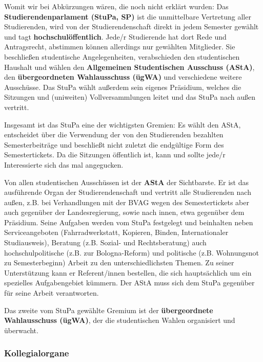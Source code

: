 Womit wir bei Abkürzungen wären, die noch nicht erklärt wurden: Das \textbf{Studierendenparlament (StuPa, SP)} ist die 
unmittelbare Vertretung aller Studierenden, wird von der Studierendenschaft 
direkt in jedem Semester gewählt und tagt \textbf{hochschulöffentlich}.
Jede/r Studierende hat dort Rede und Antragsrecht, abstimmen können allerdings nur 
gewählten Mitglieder. Sie beschließen studentische Angelegenheiten, verabschieden den studentischen
Haushalt und wählen den \textbf{Allgemeinen Studentischen Ausschuss (AStA)},
den \textbf{übergeordneten Wahlausschuss (ügWA)}
und verschiedene weitere Ausschüsse. Das StuPa wählt außerdem sein eigenes
Präsidium, welches die Sitzungen und (uniweiten) Vollversammlungen leitet und
das StuPa nach außen  vertritt.  

Insgesamt ist das StuPa eine der wichtigsten Gremien: Es wählt den AStA, entscheidet über die Verwendung der von den Studierenden bezahlten Semesterbeiträge 
und beschließt nicht zuletzt die endgültige Form des Semestertickets. 
Da die Sitzungen öffentlich ist, kann und sollte jede/r Interessierte sich das mal angegucken.

Von allen studentischen Ausschüssen ist der \textbf{AStA}  der
Sichtbarste. Er ist das ausführende Organ der 
Studierendenschaft und vertritt alle Studierenden nach außen, z.B. bei
Verhandlungen mit der BVAG wegen des Semestertickets aber auch gegenüber der 
Landesregierung, sowie nach innen, etwa gegenüber dem Präsidium. Seine Aufgaben werden vom 
StuPa festgelegt und beinhalten neben Serviceangeboten (Fahrradwerkstatt, Kopieren, Binden, 
Internationaler Studiausweis), Beratung (z.B. Sozial- und Rechtsberatung) auch hochschulpolitische 
(z.B. zur Bologna-Reform) und politische (z.B. Wohnungsnot zu Semesterbeginn) Arbeit zu den 
unterschiedlichsten Themen. Zu seiner Unterstützung kann er Referent/innen 
bestellen, die sich hauptsächlich um ein spezielles Aufgabengebiet kümmern.
Der AStA muss sich dem StuPa gegenüber für seine Arbeit verantworten.

Das zweite vom StuPa gewählte Gremium ist der \textbf{übergeordnete 
Wahlausschuss (ügWA)}, der die studentischen Wahlen organisiert und überwacht.

\subsubsection*{Kollegialorgane}

